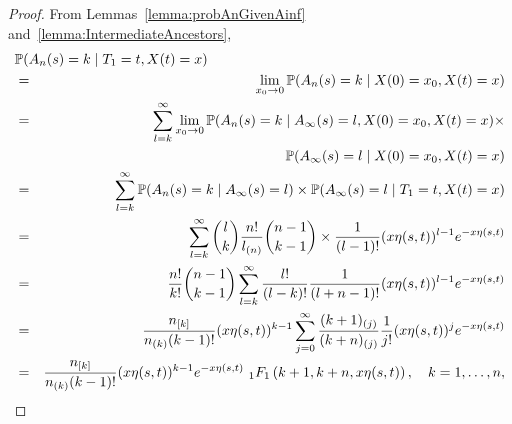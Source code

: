 \documentclass[preprint,12pt]{elsarticle}
\begin{document}
\begin{proof}
From Lemmas~\ref{lemma:probAnGivenAinf} and~\ref{lemma:IntermediateAncestors},
\begin{eqnarray*}	
\lefteqn{\mathbb{P}(A_n(s) = k \mid T_1 = t, X(t) = x)} \nonumber \\ 
	& = & \lim_{x_0 \to 0} \mathbb{P}(A_n(s) = k \mid X(0) = x_0, X(t) = x) \nonumber \\
	& = & \sum_{l = k}^\infty \lim_{x_0 \to 0} \mathbb{P}(A_n(s) = k \mid A_\infty(s) = l, X(0) = x_0, X(t) = x) \times \nonumber \\
	&    & \qquad\qquad\qquad \mathbb{P}(A_\infty(s) = l \mid X(0) = x_0, X(t) = x) \nonumber \\ 
	& = & \sum_{l = k}^\infty\mathbb{P}(A_n(s) = k \mid A_\infty(s) = l) \times \mathbb{P}(A_\infty(s) = l \mid T_1 = t, X(t) = x) \nonumber \\ 	
	& = & \sum_{l = k}^\infty \binom{l}{k} \frac{n!}{l_{(n)}} \binom{n - 1}{k - 1} \times \frac{1}{(l - 1)!} (x\eta(s, t))^{l - 1} e^{-x\eta(s, t)} \nonumber \\ 
	& = & \frac{n!}{k!} \binom{n - 1}{k - 1} \sum_{l = k}^\infty \frac{l!}{(l - k)!} \frac{1}{(l + n - 1)!} (x\eta(s, t))^{l - 1} e^{-x\eta(s, t)} \nonumber \\ 
	& = & \frac{n_{[k]}}{n_{(k)} (k - 1)!} (x\eta(s, t))^{k - 1} 
								\sum_{j = 0}^\infty \frac{(k + 1)_{(j)}}{(k + n)_{(j)}} \frac{1}{j!} (x\eta(s, t))^j e^{-x\eta(s, t)} \nonumber \\ 
	& = & \frac{n_{[k]}}{n_{(k)} (k - 1)!} (x\eta(s, t))^{k - 1} e^{-x\eta(s, t)} ~_1F_1\left(k + 1, k + n, x\eta(s, t)\right),  \quad k = 1, \ldots, n,  \nonumber
\end{eqnarray*}
\end{proof}
\end{document}
